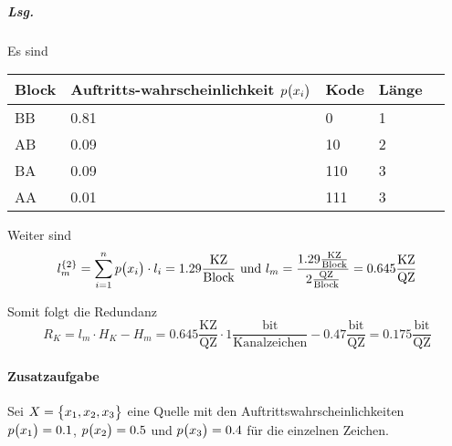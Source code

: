 \documentclass{scrreprt}
\begin{document}
\begin{enumerate}[1.]
\begin{enumerate}[(a)]
    \subparagraph{Lsg.} Es sind

    \begin{tabularx}{\textwidth}{|X|X|X|X|X|}
      \hline
      Block & Auftritts-wahrscheinlichkeit $p\qty\big(x_i)$ & Kode & Länge \\
      \hline
      BB & 0.81 & 0   & 1 \\
      AB & 0.09 & 10  & 2 \\
      BA & 0.09 & 110 & 3 \\
      AA & 0.01 & 111 & 3 \\
      \hline
    \end{tabularx}
    Weiter sind
    \[
      l_m^{\qty{2}} = \sum_{i = 1}^n p\qty\big(x_i) \cdot l_i = 1.29 \frac{\text{KZ}}{\text{Block}}
      \text{ und }
      l_m = \frac{1.29 \frac{\text{KZ}}{\text{Block}}}{2 \frac{\text{QZ}}{\text{Block}}} = 0.645 \frac{\text{KZ}}{\text{QZ}}
    \]

    Somit folgt die Redundanz
    \[
      R_K = l_m \cdot H_K - H_m = 0.645 \frac{\text{KZ}}{\text{QZ}} \cdot 1 \frac{\text{bit}}{\text{Kanalzeichen}} - 0.47 \frac{\text{bit}}{\text{QZ}} = 0.175 \frac{\text{bit}}{\text{QZ}}
    \]
  \end{enumerate}
\end{enumerate}

\newpage
\paragraph{Zusatzaufgabe} Sei $X = \qty\big{x_1, x_2, x_3}$ eine Quelle mit den
Auftrittswahrscheinlichkeiten $p\qty\big(x_1) = 0.1$, $p\qty\big(x_2) = 0.5$ und
$p\qty\big(x_3) = 0.4$ für die einzelnen Zeichen.
\end{document}
